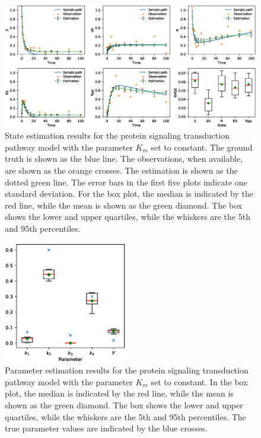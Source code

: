 \begin{figure}
    \centering
    \includegraphics[width=\textwidth]{graphics/protein-states-without-km}
    \caption{State estimation results for the protein signaling transduction pathway model with the parameter $K_m$ set to constant. The ground truth is shown as the blue line. The observations, when available, are shown as the orange crosses. The estimation is shown as the dotted green line. The error bars in the first five plots indicate one standard deviation. For the box plot, the median is indicated by the red line, while the mean is shown as the green diamond. The box shows the lower and upper quartiles, while the whiskers are the 5th and 95th percentiles.}
    \label{fig-protein-states-without-km}
\end{figure}

\begin{figure}
    \centering
    \includegraphics[width=0.48\textwidth]{graphics/protein-parameters-without-km}
    \caption{Parameter estimation results for the protein signaling transduction pathway model with the parameter $K_m$ set to constant. In the box plot, the median is indicated by the red line, while the mean is shown as the green diamond. The box shows the lower and upper quartiles, while the whiskers are the 5th and 95th percentiles. The true parameter values are indicated by the blue crosses.}
    \label{fig-protein-parameters-without-km}
\end{figure}

